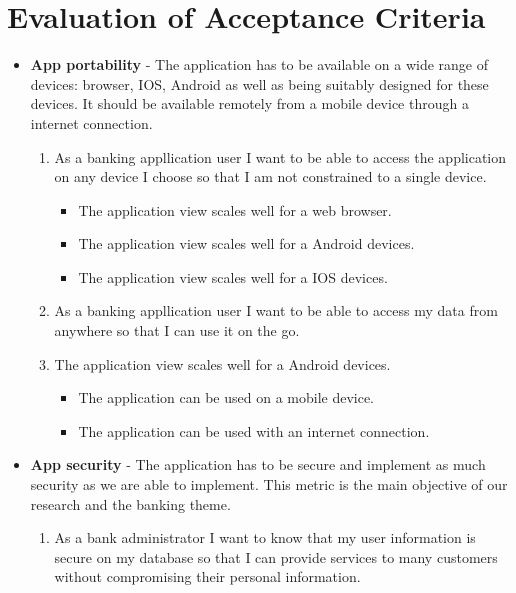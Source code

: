 \section{Evaluation of Acceptance Criteria}
\begin{itemize}
\item \textbf{App portability} - The application has to be available on a wide range of devices: browser, IOS, Android as well as being suitably designed for these devices. It should be available remotely from a mobile device through a internet connection.
        \begin{enumerate}
        \item As a banking appllication user I want to be able to access the application on any device I choose so that I am not constrained to a single device.
        \begin{itemize}
                \item The application view scales well for a web browser.
                \item The application view scales well for a Android devices.
                \item The application view scales well for a IOS devices.
            \end{itemize}
        \item As a banking appllication user I want to be able to access my data from anywhere so that I can use it on the go.
        \item The application view scales well for a Android devices.
            \begin{itemize}
                \item The application can be used on a mobile device.
                \item The application can be used with an internet connection.
            \end{itemize}
        \end{enumerate}
    \item  \textbf{App security} - The application has to be secure and implement as much security as we are able to implement. This metric is the main objective of our research and the banking theme.
        \begin{enumerate}
        \item As a bank administrator I want to know that my user information is secure on my database so that I can provide services to many customers without compromising their personal information.
        \begin{itemize}

\end{itemize}
\end{enumerate}
\end{itemize}
